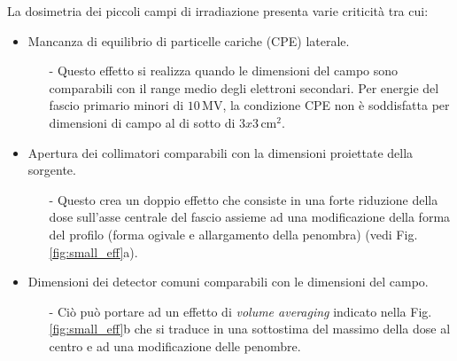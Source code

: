 La dosimetria dei piccoli campi di irradiazione presenta varie criticità \cite{Das2008} tra cui:
\begin{itemize}
\item Mancanza di equilibrio di particelle cariche (CPE) laterale.
\begin{itemize}
\item[-] Questo effetto si realizza quando le dimensioni del campo sono comparabili con il range medio degli elettroni secondari. Per energie del fascio primario minori di $10\,$MV, la condizione CPE non è soddisfatta per dimensioni di campo al di sotto di $3x3\,$cm$^2$.
\end{itemize}
\item Apertura dei collimatori comparabili con la dimensioni proiettate della sorgente.
\begin{itemize}
\item[-] Questo crea un doppio effetto che consiste in una forte riduzione della dose sull'asse centrale del fascio assieme ad una modificazione della forma del profilo (forma ogivale e allargamento della penombra) (vedi Fig.\ref{fig:small_eff}a).
\end{itemize}
\item Dimensioni dei detector comuni comparabili con le dimensioni del campo.
\begin{itemize}
\item[-] Ciò può portare ad un effetto di \textit{volume averaging} indicato nella Fig.\ref{fig:small_eff}b che si traduce in una sottostima del massimo della dose al centro e ad una modificazione delle penombre.
\end{itemize}
\end{itemize}
